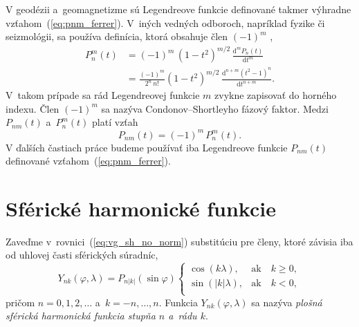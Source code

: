 \documentclass[a4paper,12pt]{book}
\newcommand{\diff}{\mathrm d}
\begin{document}
V geodézii a~geomagnetizme sú Legendreove funkcie definované takmer výhradne 
vzťahom~(\ref{eq:pnm_ferrer}).  V~iných vedných odboroch, napríklad fyzike či 
seizmológii, sa používa definícia, ktorá obsahuje člen $(-1)^m$ 
\parencite[pozri][]{Wieczorek2015,Olver2010},
%
\begin{equation}
\begin{split}
P_n^m(t) &= (-1)^m \, (1 - t^2)^{m \slash 2} \, \frac{\diff^m P_n(t)}{\diff 
t^m}\\
%
&= \frac{(-1)^m}{2^n \, n!} (1 - t^2)^{ m \slash 2} \, \frac{\diff^{n + m}
(t^2 - 1)^n}{\diff t^{n + m}}{.}
\end{split}
\end{equation}
%
V~takom prípade sa rád Legendreovej funkcie $m$ zvykne zapisovať do horného 
indexu.  Člen $(-1)^{m}$ sa nazýva Condonov--Shortleyho fázový faktor.  Medzi 
$P_{nm}(t)$ a~$P_n^m(t)$ platí vzťah
%
\begin{equation}
P_{nm}(t) = (-1)^m \, P_n^m(t){.}
\end{equation}
%
V ďalších častiach práce budeme používať iba Legendreove funkcie $P_{nm}(t)$ 
definované vzťahom~(\ref{eq:pnm_ferrer}).




\section{Sférické harmonické funkcie}
\label{sec:spherical_harmonics}

Zaveďme v~rovnici~(\ref{eq:vg_sh_no_norm}) substitúciu pre členy, ktoré závisia
iba od uhlovej časti sférických súradníc,
%
\begin{equation}
\label{eq:ynk_no_norm}
Y_{nk}(\varphi, \lambda) = P_{n|k|}(\sin\varphi)
%
\begin{cases}
\cos(k\lambda){,}    &\text{ak} \quad k \geq 0{,}\\
\sin(|k|\lambda){,}  &\text{ak} \quad k < 0{,}\\
\end{cases}
\end{equation}
%
pričom $n = 0, 1, 2, \dots$ a~$k = -n, \dots, n$.  Funkcia $Y_{nk}(\varphi,
\lambda)$ sa nazýva \emph{plošná sférická harmonická funkcia stupňa $n$ a~rádu
$k$}.
\end{document}
